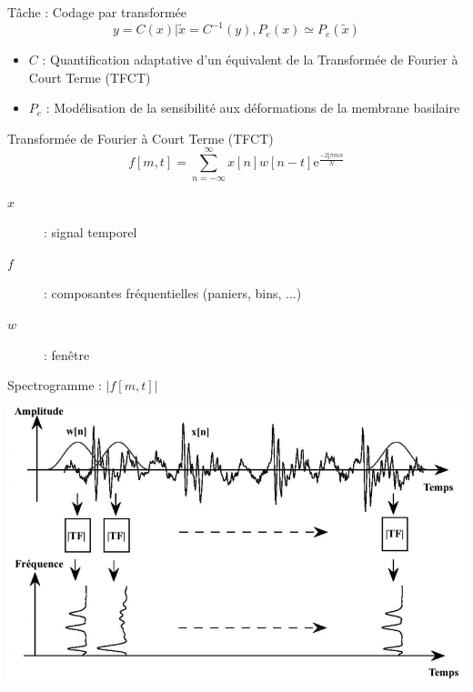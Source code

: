 \begin{frame}{\alert{Tâche} : Codage par transformée}
$$y = C(x) | \tilde{x} = C^{-1}(y), P_e(x) \simeq P_e(\tilde{x})$$
\begin{itemize}
\item $C$ : Quantification adaptative d'un équivalent de la Transformée de Fourier à Court Terme (TFCT)
\item $P_e$ : Modélisation de la sensibilité aux déformations de la membrane basilaire
\end{itemize}
\end{frame}

\begin{frame}{Transformée de Fourier à Court Terme (TFCT)}
$$ f[m, t] = \sum_{n = - \infty}^{\infty} x[n] w[n-t] \mathrm{e}^{\frac{-2 \mathrm{j}  \pi m n}{N}} $$

\begin{description}
\item[$x$]: signal temporel
\item[$f$]: composantes fréquentielles (paniers, bins, ...)
\item[$w$]: fenêtre
\end{description}
\end{frame}

\begin{frame}{Spectrogramme : $|f[m, t]|$}
\begin{center}
\includegraphics[width=.8\columnwidth]{figures/tfct} \\
\end{center}
\end{frame}

